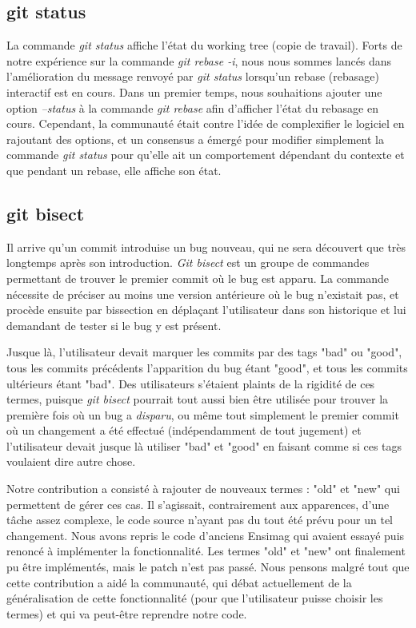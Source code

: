 \documentclass[a4paper, 12pt]{article}
\newcommand{\gitcmd}[1]{\emph{#1}}
\begin{document}
\subsection{git status}

La commande \gitcmd{git status} affiche l'état du working tree (copie de travail).
Forts de notre expérience sur la commande \gitcmd{git rebase -i}, nous nous sommes lancés dans l'amélioration du message renvoyé par \gitcmd{git status} lorsqu'un rebase (rebasage) interactif est en cours.
Dans un premier temps, nous souhaitions ajouter une option \textit{--status} à la commande \gitcmd{git rebase} afin d'afficher l'état du rebasage en cours. 
Cependant, la communauté était contre l'idée de complexifier le logiciel en rajoutant des options, et un consensus a émergé pour modifier simplement la commande \gitcmd{git status} pour qu'elle ait un comportement dépendant du contexte et que pendant un rebase, elle affiche son état.

\subsection{git bisect}

Il arrive qu'un commit introduise un bug nouveau, qui ne sera découvert que très longtemps après son introduction. \gitcmd{Git bisect} est un groupe de commandes permettant de trouver le premier commit où le bug est apparu. La commande nécessite de préciser au moins une version antérieure où le bug n'existait pas, et procède ensuite par bissection en déplaçant l'utilisateur dans son historique et lui demandant de tester si le bug y est présent.

Jusque là, l'utilisateur devait marquer les commits par des tags "bad" ou "good", tous les commits précédents l'apparition du bug étant "good", et tous les commits ultérieurs étant "bad". Des utilisateurs s'étaient plaints de la rigidité de ces termes, puisque \gitcmd{git bisect} pourrait tout aussi bien être utilisée pour trouver la première fois où un bug a \emph{disparu}, ou même tout simplement le premier commit où un changement a été effectué (indépendamment de tout jugement) et l'utilisateur devait jusque là utiliser "bad" et "good" en faisant comme si ces tags voulaient dire autre chose.

Notre contribution a consisté à rajouter de nouveaux termes : "old" et "new" qui permettent de gérer ces cas. Il s'agissait, contrairement aux apparences, d'une tâche assez complexe, le code source n'ayant pas du tout été prévu pour un tel changement. Nous avons repris le code d'anciens Ensimag qui avaient essayé puis renoncé à implémenter la fonctionnalité. Les termes "old" et "new" ont finalement pu être implémentés, mais le patch n'est pas passé. Nous pensons malgré tout que cette contribution a aidé la communauté, qui débat actuellement de la généralisation de cette fonctionnalité (pour que l'utilisateur puisse choisir les termes) et qui va peut-être reprendre notre code.
\end{document}
